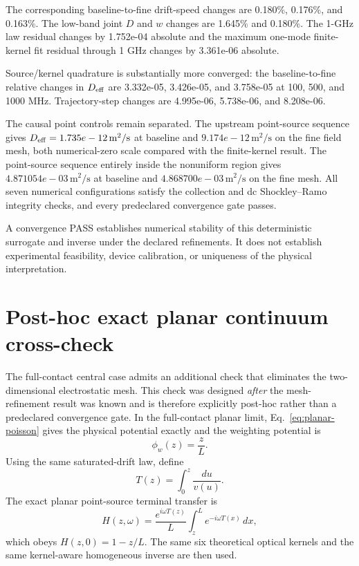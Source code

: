 \documentclass[aps,pra,onecolumn,superscriptaddress,nofootinbib]{revtex4-2}
\begin{document}
The corresponding baseline-to-fine drift-speed changes are 0.180\%, 0.176\%, and 0.163\%.  The low-band joint $D$ and $w$ changes are 1.645\% and 0.180\%.  The 1-GHz law residual changes by 1.752e-04 absolute and the maximum one-mode finite-kernel fit residual through 1 GHz changes by 3.361e-06 absolute.

Source/kernel quadrature is substantially more converged: the baseline-to-fine relative changes in $D_{\rm eff}$ are 3.332e-05, 3.426e-05, and 3.758e-05 at 100, 500, and 1000 MHz.  Trajectory-step changes are 4.995e-06, 5.738e-06, and 8.208e-06.

The causal point controls remain separated.  The upstream point-source sequence gives $D_{\rm eff}=1.735e-12\,\mathrm{m^2/s}$ at baseline and $9.174e-12\,\mathrm{m^2/s}$ on the fine field mesh, both numerical-zero scale compared with the finite-kernel result.  The point-source sequence entirely inside the nonuniform region gives $4.871054e-03\,\mathrm{m^2/s}$ at baseline and $4.868700e-03\,\mathrm{m^2/s}$ on the fine mesh.  All seven numerical configurations satisfy the collection and dc Shockley--Ramo integrity checks, and every predeclared convergence gate passes.

A convergence PASS establishes numerical stability of this deterministic surrogate and inverse under the declared refinements.  It does not establish experimental feasibility, device calibration, or uniqueness of the physical interpretation.

\section{Post-hoc exact planar continuum cross-check}

The full-contact central case admits an additional check that eliminates the two-dimensional electrostatic mesh.  This check was designed \emph{after} the mesh-refinement result was known and is therefore explicitly post-hoc rather than a predeclared convergence gate.  In the full-contact planar limit, Eq.~\eqref{eq:planar-poisson} gives the physical potential exactly and the weighting potential is
\begin{equation}
\phi_w(z)=\frac{z}{L}.
\end{equation}
Using the same saturated-drift law, define
\begin{equation}
T(z)=\int_0^z\frac{du}{v(u)}.
\end{equation}
The exact planar point-source terminal transfer is
\begin{equation}
H(z,\omega)=\frac{e^{i\omega T(z)}}{L}\int_z^L e^{-i\omega T(x)}\,dx,
\end{equation}
which obeys $H(z,0)=1-z/L$.  The same six theoretical optical kernels and the same kernel-aware homogeneous inverse are then used.
\end{document}
